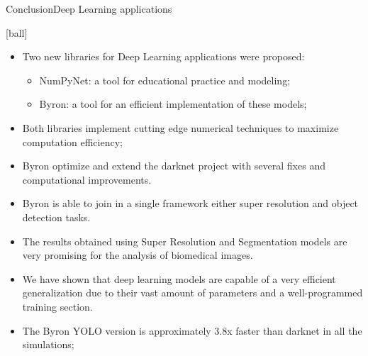 \documentclass{standalone}
\begin{document}
\begin{frame}{Conclusion}{Deep Learning applications}

  [ball]

  \begin{itemize}

    \item Two new libraries for Deep Learning applications were proposed:
      \begin{itemize}
        \item \textsf{NumPyNet}: a tool for educational practice and modeling;
        \item \textsf{Byron}: a tool for an efficient implementation of these models;
      \end{itemize}

    \item Both libraries implement cutting edge numerical techniques to maximize computation efficiency;

    \item \textsf{Byron} optimize and extend the \textsf{darknet} project with several fixes and computational improvements.

    \item \textsf{Byron} is able to join in a single framework either super resolution and object detection tasks.

    \item The results obtained using Super Resolution and Segmentation models are very promising for the analysis of biomedical images.

    \item We have shown that deep learning models are capable of a very efficient generalization due to their vast amount of parameters and a well-programmed training section.

    \item The \textsf{Byron} YOLO version is approximately 3.8x faster than \textsf{darknet} in all the simulations;

  \end{itemize}

\end{frame}




\end{document}

